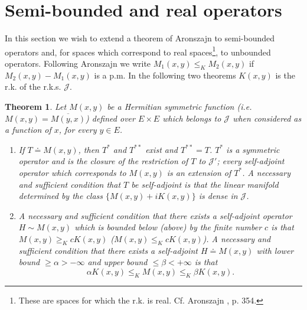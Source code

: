 \documentclass{article}
\newtheorem{theorem}{Theorem}
\begin{document}
\section{Semi-bounded and real operators}
\label{sec:semi-bounded}

In this section we wish to extend a theorem of Aronszajn to semi-bounded operators and, for spaces which correspond to real spaces\footnote{These are spaces for which the r.k. is real. Cf. Aronszajn \cite{aronszajn2}, p. 354.}, to unbounded operators. Following Aronszajn we write $M_1(x, y) \leq_K M_2(x, y)$ if $M_2(x, y) - M_1(x, y)$ is a p.m. In the following two theorems $K(x, y)$ is the r.k. of the r.k.s. $\mathcal{J}$.

\begin{theorem}
\label{thm:semi-bounded}
Let $M(x, y)$ be a Hermitian symmetric function (i.e. $M(x, y) = \overline{M(y, x)}$) defined over $E \times E$ which belongs to $\mathcal{J}$ when considered as a function of $x$, for every $y \in E$.
\begin{enumerate}[label=(\alph*)]
\item If $T \doteq M(x, y)$, then $T^*$ and $T^{**}$ exist and $T^{**} = T$. $T^*$ is a symmetric operator and is the closure of the restriction of $T$ to $\mathcal{J}'$; every self-adjoint operator which corresponds to $M(x, y)$ is an extension of $T^*$. A necessary and sufficient condition that $T$ be self-adjoint is that the linear manifold determined by the class $\{M(x, y) + iK(x, y)\}$ is dense in $\mathcal{J}$.
\item A necessary and sufficient condition that there exists a self-adjoint operator $H \sim M(x, y)$ which is bounded below (above) by the finite number $c$ is that $M(x, y) \geq_K cK(x, y)$ ($M(x, y) \leq_K cK(x, y)$). A necessary and sufficient condition that there exists a self-adjoint $H \doteq M(x, y)$ with lower bound $\geq \alpha > -\infty$ and upper bound $\leq \beta < +\infty$ is that
\begin{equation}
\alpha K(x, y) \leq_K M(x, y) \leq_K \beta K(x, y).
\label{eq:bounded-operator}
\end{equation}
\end{enumerate}
\end{theorem}
\end{document}
